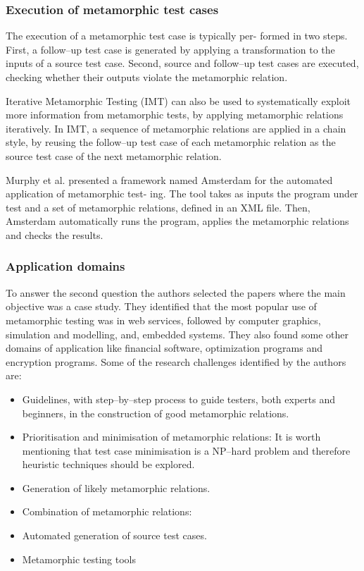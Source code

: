 		\subsubsection{Execution of metamorphic test cases}
		The execution of a metamorphic test case is typically per- formed in two steps. First, a follow–up test case is generated by applying a transformation to the inputs of a source test case. Second, source and follow–up test cases are executed, checking whether their outputs violate the metamorphic relation. \par
		Iterative Metamorphic Testing (IMT) can also be used to systematically exploit more information from metamorphic tests, by applying metamorphic relations iteratively. In IMT, a sequence of metamorphic relations are applied in a chain style, by reusing the follow–up test case of each metamorphic relation as the source test case of the next metamorphic relation. \par
		Murphy et al. \cite{} presented a framework named Amsterdam for the automated application of metamorphic test- ing. The tool takes as inputs the program under test and a set of metamorphic relations, defined in an XML file. Then, Amsterdam automatically runs the program, applies the metamorphic relations and checks the results.
		\subsubsection{Application domains}
		To answer the second question the authors selected the papers where the main objective was a case study. They identified that the most popular use of metamorphic testing was in web services, followed by computer graphics, simulation and modelling, and, embedded systems. They also found some other domains of application like financial software, optimization programs and encryption programs.
		Some of the research challenges identified by the authors are:
		\begin{itemize}
			\item Guidelines, with step–by–step process to guide testers, both experts and beginners, in the construction of good metamorphic relations.
			\item Prioritisation and minimisation of metamorphic relations: It is worth mentioning that test case minimisation is a NP–hard problem and therefore heuristic techniques should be explored.
			\item Generation of likely metamorphic relations.
			\item Combination of metamorphic relations:
			\item Automated generation of source test cases.
			\item Metamorphic testing tools
		\end{itemize}



